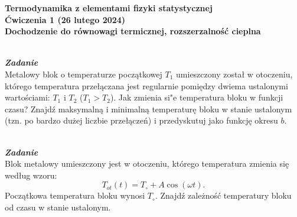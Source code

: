 \documentclass[11pt,a4paper]{article}
\newcounter{zadanie}\newcommand{\zadanie}[1][]{\addtocounter{zadanie}{1} ~\\  {\bf \emph{Zadanie \arabic{zadanie} #1 }} \\}
\begin{document}

\begin{centering}
\bf{\Large{Termodynamika z elementami fizyki statystycznej}}\\
Ćwiczenia 1 (26 lutego 2024)\\[5mm]
Dochodzenie do równowagi termicznej, rozszerzalność cieplna \\
\end{centering}
\vspace{1mm}

\zadanie
Metalowy blok o temperaturze początkowej $T_1$ umieszczony został
w otoczeniu, którego temperatura przełączana jest regularnie
pomiędzy dwiema ustalonymi wartościami: $T_1$ i $T_2$ ($T_1>T_2$).
Jak zmienia si"e temperatura bloku w funkcji czasu?
Znajdź maksymalną i minimalną temperaturę bloku
w stanie ustalonym (tzn. po bardzo dużej liczbie przełączeń)
i przedyskutuj jako funkcję okresu $b$.
\begin{center}
\end{center}\vspace{-5mm}
\vskip 10pt

\zadanie
Blok metalowy umieszczony jest w otoczeniu, którego temperatura
zmienia się według wzoru:
\[T_{ot}(t) = T_\circ + A \cos(\omega t).\]
Początkowa temperatura bloku wynosi $T_\circ$. Znajdź zależność
temperatury bloku od czasu w stanie ustalonym.
\vskip 10pt
\end{document}
